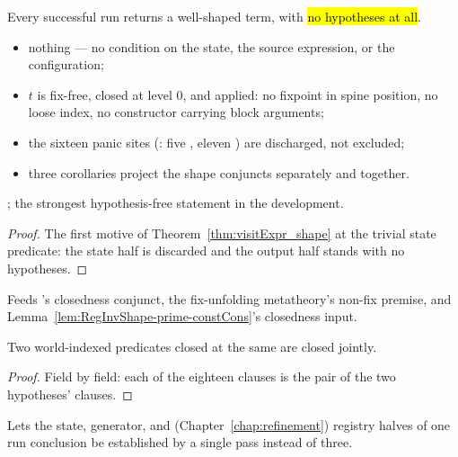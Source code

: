 \begin{theorem}
\label{thm:visitExpr_shape_all}
\leanok
{}
 Every successful  run returns a well-shaped \lbox{} term, with
\hl{no hypotheses at all}.
\begin{itemize}
\item {} nothing --- no condition on the state, the source expression, or the configuration;
\item {} $t$ is fix-free, closed at level $0$, and applied: no fixpoint in spine position, no
loose index, no constructor carrying block arguments;
\item the sixteen panic sites (: five , eleven )
are discharged, not excluded;
\item three corollaries project the shape conjuncts separately and together.
\end{itemize}
 \stProved{}; the strongest hypothesis-free statement in the development.
\end{theorem}
\begin{proof}
\leanok
{}
 The first motive of Theorem~\ref{thm:visitExpr_shape} at the trivial state predicate: the
state half is discarded and the output half stands with no hypotheses.
\end{proof}
\begin{remark}
 Feeds 's closedness conjunct, the fix-unfolding metatheory's
non-fix premise, and Lemma~\ref{lem:RegInvShape-prime-constCons}'s closedness input.
\end{remark}
\begin{lemma}
\label{lem:RunClosedW-and}
\leanok
{}
 Two world-indexed predicates closed at the same  are closed jointly.
\end{lemma}
\begin{proof}
\leanok
{}
 Field by field: each of the eighteen clauses is the pair of the two hypotheses' clauses.
\end{proof}
\begin{remark}
 Lets the state, generator, and (Chapter~\ref{chap:refinement}) registry halves of one run
conclusion be established by a single pass instead of three.
\end{remark}
